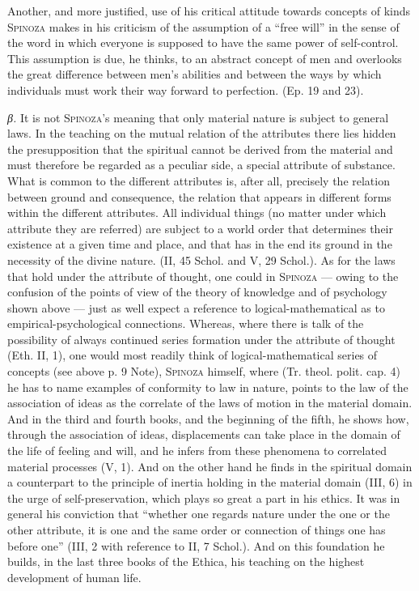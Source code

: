 \documentclass[12pt]{article}
\begin{document}
Another, and more justified, use of his critical attitude towards concepts of kinds
\textsc{Spinoza} makes in his criticism of the assumption of a ``free will'' in the sense of
the word in which everyone is supposed to have the same power of self-control. This
assumption is due, he thinks, to an abstract concept of men and overlooks the great
difference between men's abilities and between the ways by which individuals must work
their way forward to perfection. (Ep. 19 and 23).

\textit{β.} It is not \textsc{Spinoza}'s meaning that only material nature is subject to
general laws. In the teaching on the mutual relation of the attributes there lies hidden the
presupposition that the spiritual cannot be derived from the material and must therefore be
regarded as a peculiar side, a special attribute of substance. What is common to the
different attributes is, after all, precisely the relation between ground and consequence,
the relation that appears in different forms within the different attributes. All
individual things (no matter under which attribute they are referred) are subject to a world
order that determines their existence at a given time and place, and that has in the end its
ground in the necessity of the divine nature. (II, 45 Schol. and V, 29 Schol.). As for the
laws that hold under the attribute of thought, one could in \textsc{Spinoza} --- owing to the
confusion of the points of view of the theory of knowledge and of psychology shown above ---
just as well expect a reference to logical-mathematical as to empirical-psychological
connections. Whereas, where there is talk of the possibility of always continued series
formation under the attribute of thought (Eth. II, 1), one would most readily think of
logical-mathematical series of concepts (see above p. 9 Note), \textsc{Spinoza} himself,
where (Tr. theol. polit. cap. 4) he has to name examples of conformity to law in nature,
points to the law of the association of ideas as the correlate of the laws of motion in the
material domain. And in the third and fourth books, and the beginning of the fifth, he shows
how, through the association of ideas, displacements can take place in the domain of the
life of feeling and will, and he infers from these phenomena to correlated material
processes (V, 1). And on the other hand he finds in the spiritual domain a counterpart to
the principle of inertia holding in the material domain (III, 6) in the urge of
self-preservation, which plays so great a part in his ethics. It was in general his
conviction that ``whether one regards nature under the one or the other attribute, it is one
and the same order or connection of things one has before one'' (III, 2 with reference to
II, 7 Schol.). And on this foundation he builds, in the last three books of the Ethica, his
teaching on the highest development of human life.
\end{document}
